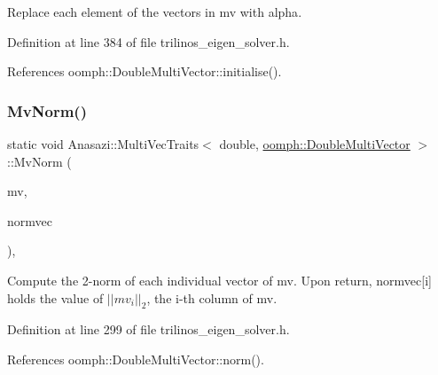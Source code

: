 Replace each element of the vectors in {\ttfamily mv} with {\ttfamily alpha}. 



Definition at line 384 of file trilinos\+\_\+eigen\+\_\+solver.\+h.



References oomph\+::\+Double\+Multi\+Vector\+::initialise().

\mbox{\label{classAnasazi_1_1MultiVecTraits_3_01double_00_01oomph_1_1DoubleMultiVector_01_4_ac6fd03656134d6fccd7113a6876ba97e}} 
\subsubsection{\texorpdfstring{Mv\+Norm()}{MvNorm()}}
{\footnotesize\ttfamily static void Anasazi\+::\+Multi\+Vec\+Traits$<$ double, \hyperlink{classoomph_1_1DoubleMultiVector}{oomph\+::\+Double\+Multi\+Vector} $>$\+::Mv\+Norm (\begin{DoxyParamCaption}\item[{const \hyperlink{classoomph_1_1DoubleMultiVector}{oomph\+::\+Double\+Multi\+Vector} \&}]{mv,  }\item[{std\+::vector$<$ double $>$ \&}]{normvec }\end{DoxyParamCaption})\hspace{0.3cm}{\ttfamily [inline]}, {\ttfamily [static]}}



Compute the 2-\/norm of each individual vector of {\ttfamily mv}. Upon return, {\ttfamily normvec}\mbox{[}i\mbox{]} holds the value of $||mv_i||_2$, the {\ttfamily i-\/th} column of {\ttfamily mv}. 



Definition at line 299 of file trilinos\+\_\+eigen\+\_\+solver.\+h.



References oomph\+::\+Double\+Multi\+Vector\+::norm().

\mbox{\label{classAnasazi_1_1MultiVecTraits_3_01double_00_01oomph_1_1DoubleMultiVector_01_4_a52dc632ffd66eb35ad481c6d36d71960}} 
